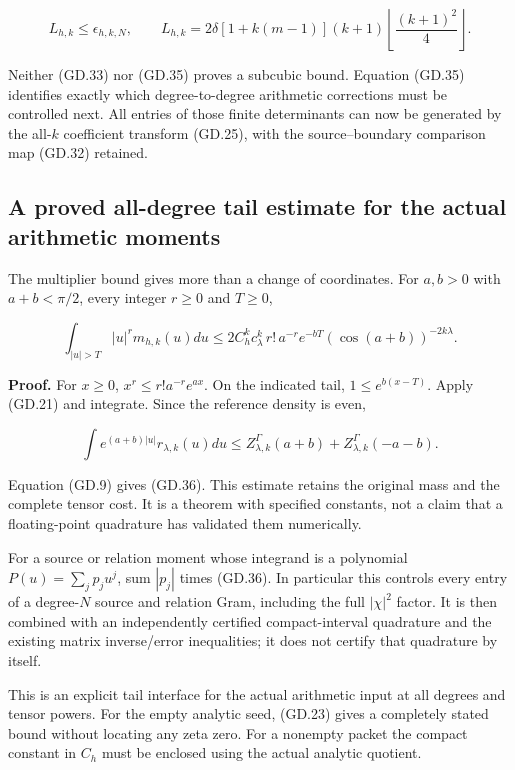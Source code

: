 \[
L_{h,k}\le\epsilon_{h,k,N},\qquad
L_{h,k}=2\delta[1+k(m-1)](k+1)
          \left\lfloor\frac{(k+1)^2}{4}\right\rfloor.
\]

Neither (GD.33) nor (GD.35) proves a subcubic bound. Equation (GD.35) identifies
exactly which degree-to-degree arithmetic corrections must be controlled
next. All entries of those finite determinants can now be generated by
the all-\(k\) coefficient transform (GD.25), with the source--boundary
comparison map (GD.32) retained.

\subsection[\hspace{0.4em}A proved all-degree tail estimate for the actual arithmetic
moments]{A proved all-degree tail estimate for the actual arithmetic
moments}\label{gammad-a-proved-all-degree-tail-estimate-for-the-actual-arithmetic-moments}

The multiplier bound gives more than a change of coordinates. For
\(a,b>0\) with \(a+b<\pi/2\), every integer \(r\ge0\) and \(T\ge0\),

\[
\boxed{
\int_{|u|>T}|u|^r m_{h,k}(u)du
\le
2 C_h^k c_\lambda^k\,r!\,a^{-r}
 e^{-bT}(\cos(a+b))^{-2k\lambda}.
}                                                                   \tag{GD.36}
\]

\textbf{Proof.} For \(x\ge0\), \(x^r\le r!a^{-r}e^{ax}\). On the
indicated tail, \(1\le e^{b(x-T)}\). Apply (GD.21) and integrate. Since the
reference density is even,

\[
\int e^{(a+b)|u|}r_{\lambda,k}(u)du
\le Z_{\lambda,k}^\Gamma(a+b)+Z_{\lambda,k}^\Gamma(-a-b).
\]

Equation (GD.9) gives (GD.36). This estimate retains the original mass and the
complete tensor cost. It is a theorem with specified constants, not a
claim that a floating-point quadrature has validated them numerically.

For a source or relation moment whose integrand is a polynomial
\(P(u)=\sum_j p_ju^j\), sum \(|p_j|\) times (GD.36). In particular this
controls every entry of a degree-\(N\) source and relation Gram,
including the full \(|\chi|^2\) factor. It is then combined with an
independently certified compact-interval quadrature and the existing
matrix inverse/error inequalities; it does not certify that quadrature
by itself.

This is an explicit tail interface for the actual arithmetic input at
all degrees and tensor powers. For the empty analytic seed, (GD.23) gives a
completely stated bound without locating any zeta zero. For a nonempty
packet the compact constant in \(C_h\) must be enclosed using the actual
analytic quotient.

